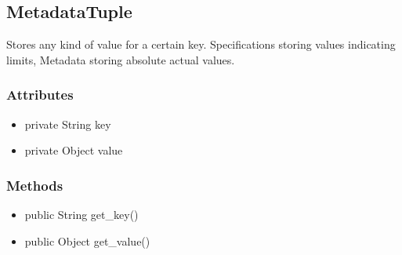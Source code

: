 \subsection{MetadataTuple}
Stores any kind of value for a certain key. Specifications storing values indicating limits, Metadata storing absolute actual values.

\subsubsection{Attributes}
\begin{itemize}
	\item private String key
	\item private Object value
\end{itemize}
\subsubsection{Methods}
\begin{itemize}
	\item public String get\_key()
	\item public Object get\_value()
\end{itemize}